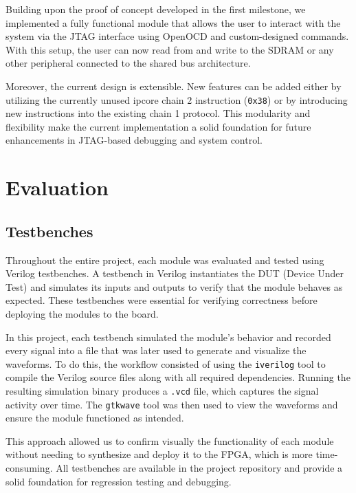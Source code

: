 \documentclass[a4paper,11pt,oneside]{report}
\begin{document}
Building upon the proof of concept developed in the first milestone, we implemented a fully functional module that allows the user to interact with the system via the JTAG interface using OpenOCD and custom-designed commands.  
With this setup, the user can now read from and write to the SDRAM or any other peripheral connected to the shared bus architecture.  

Moreover, the current design is extensible. New features can be added either by utilizing the currently unused ipcore chain 2 instruction (\texttt{0x38}) or by introducing new instructions into the existing chain 1 protocol.  
This modularity and flexibility make the current implementation a solid foundation for future enhancements in JTAG-based debugging and system control.

\chapter{Evaluation}

\section{Testbenches}

Throughout the entire project, each module was evaluated and tested using Verilog testbenches.  
A testbench in Verilog instantiates the DUT (Device Under Test) and simulates its inputs and outputs to verify that the module behaves as expected.  
These testbenches were essential for verifying correctness before deploying the modules to the board.

In this project, each testbench simulated the module's behavior and recorded every signal into a file that was later used to generate and visualize the waveforms.  
To do this, the workflow consisted of using the \texttt{iverilog} tool to compile the Verilog source files along with all required dependencies.  
Running the resulting simulation binary produces a \texttt{.vcd} file, which captures the signal activity over time.  
The \texttt{gtkwave} tool was then used to view the waveforms and ensure the module functioned as intended.

This approach allowed us to confirm visually the functionality of each module without needing to synthesize and deploy it to the FPGA, which is more time-consuming.  
All testbenches are available in the project repository and provide a solid foundation for regression testing and debugging.
\end{document}
